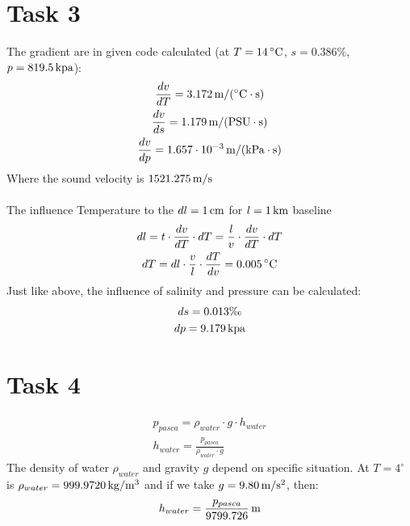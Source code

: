 \section*{Task 3}
The gradient are in given code calculated (at $T = 14\,\mathrm{^\circ C}$, $s = 0.386 \%$, $p = 819.5 \,\mathrm{kpa}$):
\begin{gather*}
	\frac{d v}{d T} = 3.172 \,\mathrm{m/(^\circ C\cdot s)} \\ 
	\frac{d v}{d s} = 1.179 \,\mathrm{m/(PSU\cdot s)} \\ 
	\frac{d v}{d p} = 1.657 \cdot 10^{-3} \,\mathrm{m/(kPa\cdot s)} \\ 
\end{gather*}
Where the sound velocity is $1521.275 \,\mathrm{m/s}$\\\\
The influence Temperature to the $dl = 1\,\mathrm{cm}$ for $l=1\,\mathrm{km}$ baseline 
\begin{gather*}
	dl = t \cdot \frac{d v}{d T} \cdot dT = \frac{l}{v} \cdot \frac{d v}{d T} \cdot dT\\
	dT = dl \cdot \frac{v}{l} \cdot \frac{dT}{dv} = 0.005 \,\mathrm{^\circ C}\\
\end{gather*}
Just like above, the influence of salinity and pressure can be calculated: 
\begin{gather*}
	ds = 0.013 \text{\textperthousand} \\
	dp = 9.179 \ut{kpa}
\end{gather*}
\section*{Task 4}
\begin{gather*}
	p_{pasca} = \rho_{water} \cdot g \cdot h_{water} \\
	h_{water} = \frac{p_{pasca}}{\rho_{water} \cdot g}
\end{gather*}
The density of water $\rho_{water}$ and gravity $g$ depend on specific situation. At $T = 4 ^\circ$ is $\rho_{water} = 999.9720 \,\mathrm{kg/m^3}$ and if we take $g = 9.80 \,\mathrm{m/s^2}$, then:
\begin{equation*}
	h_{water} = \frac{p_{pasca}}{9799.726} \,\mathrm{m}
\end{equation*} 
